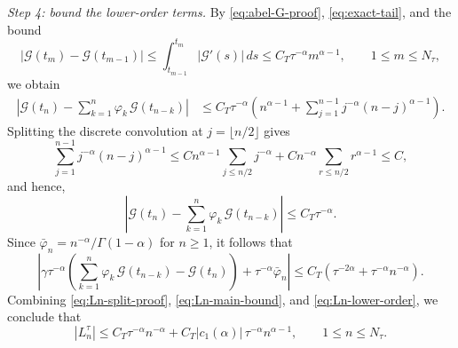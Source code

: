\documentclass[letterpaper]{article}
\numberwithin{equation}{section}
\theoremstyle{definition}
\theoremstyle{remark}
\begin{document}
\medskip
\noindent
\textit{Step 4: bound the lower-order terms.}
By \eqref{eq:abel-G-proof}, \eqref{eq:exact-tail}, and the bound
\[
  |\mathcal G(t_{m})-\mathcal G(t_{m-1})|
  \le
  \int_{t_{m-1}}^{t_m}|\mathcal G'(s)|\,ds
  \le C_T\tau^{-\alpha}m^{\alpha-1},
  \qquad 1\le m\le N_\tau,
\]
we obtain
\begin{align*}
  \left|
    \mathcal G(t_n)-\sum_{k=1}^n\varphi_k\,\mathcal G(t_{n-k})
  \right|
  &\le
  C_T\tau^{-\alpha}
  \left(
    n^{\alpha-1}
    +
    \sum_{j=1}^{n-1}j^{-\alpha}(n-j)^{\alpha-1}
  \right).
\end{align*}
Splitting the discrete convolution at $j=\lfloor n/2\rfloor$ gives
\[
  \sum_{j=1}^{n-1}j^{-\alpha}(n-j)^{\alpha-1}
  \le
  Cn^{\alpha-1}\sum_{j\le n/2}j^{-\alpha}
  +
  Cn^{-\alpha}\sum_{r\le n/2}r^{\alpha-1}
  \le C,
\]
and hence,
\[
  \left|
    \mathcal G(t_n)-\sum_{k=1}^n\varphi_k\,\mathcal G(t_{n-k})
  \right|
  \le C_T\tau^{-\alpha}.
\]
Since $\bar\varphi_n=n^{-\alpha}/\Gamma(1-\alpha)$ for $n\ge1$, it follows that
\begin{equation}\label{eq:Ln-lower-order}
  \left|
    \gamma\tau^{-\alpha}
    \left(
      \sum_{k=1}^n\varphi_k\,\mathcal G(t_{n-k})-\mathcal G(t_n)
    \right)
    +\tau^{-\alpha}\bar\varphi_n
  \right|
  \le
  C_T\left(\tau^{-2\alpha}+\tau^{-\alpha}n^{-\alpha}\right).
\end{equation}
Combining \eqref{eq:Ln-split-proof}, \eqref{eq:Ln-main-bound}, and
\eqref{eq:Ln-lower-order}, we conclude that
\begin{equation}\label{eq:Ln-final-bound}
  |L_n^\tau|
  \le
  C_T\tau^{-\alpha}n^{-\alpha}
  +
  C_T|c_1(\alpha)|\,\tau^{-\alpha}n^{\alpha-1},
  \qquad 1\le n\le N_\tau.
\end{equation}
\end{document}
